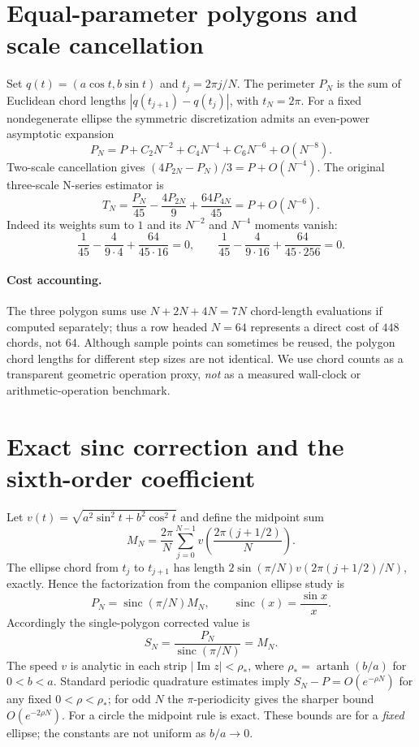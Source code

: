 \documentclass[11pt]{article}
\begin{document}
\section{Equal-parameter polygons and scale cancellation}
Set $q(t)=(a\cos t,b\sin t)$ and $t_j=2\pi j/N$. The perimeter $P_N$ is the sum of Euclidean chord lengths $|q(t_{j+1})-q(t_j)|$, with $t_N=2\pi$. For a fixed nondegenerate ellipse the symmetric discretization admits an even-power asymptotic expansion
\begin{equation}\label{eq:exp}
P_N=P+C_2N^{-2}+C_4N^{-4}+C_6N^{-6}+O(N^{-8}).
\end{equation}
Two-scale cancellation gives $(4P_{2N}-P_N)/3=P+O(N^{-4})$. The original three-scale N-series estimator is
\begin{equation}\label{eq:three}
T_N=\frac{P_N}{45}-\frac{4P_{2N}}9+\frac{64P_{4N}}{45}=P+O(N^{-6}).
\end{equation}
Indeed its weights sum to $1$ and its $N^{-2}$ and $N^{-4}$ moments vanish:
\[
\frac1{45}-\frac{4}{9\cdot 4}+\frac{64}{45\cdot16}=0,\qquad
\frac1{45}-\frac4{9\cdot16}+\frac{64}{45\cdot256}=0.
\]
\paragraph{Cost accounting.} The three polygon sums use $N+2N+4N=7N$ chord-length evaluations if computed separately; thus a row headed $N=64$ represents a direct cost of $448$ chords, not $64$. Although sample points can sometimes be reused, the polygon chord lengths for different step sizes are not identical. We use chord counts as a transparent geometric operation proxy, \emph{not} as a measured wall-clock or arithmetic-operation benchmark.
\section{Exact sinc correction and the sixth-order coefficient}
Let $v(t)=\sqrt{a^2\sin^2t+b^2\cos^2t}$ and define the midpoint sum
\[
M_N=\frac{2\pi}{N}\sum_{j=0}^{N-1}v\left(\frac{2\pi(j+1/2)}N\right).
\]
The ellipse chord from $t_j$ to $t_{j+1}$ has length $2\sin(\pi/N)v(2\pi(j+1/2)/N)$, exactly. Hence the factorization from the companion ellipse study \cite{BakerFactorization} is
\begin{equation}\label{eq:sinc}
P_N=\operatorname{sinc}(\pi/N)M_N,\qquad \operatorname{sinc}(x)=\frac{\sin x}{x}.
\end{equation}
Accordingly the single-polygon corrected value is
\begin{equation}\label{eq:correct}
S_N=\frac{P_N}{\operatorname{sinc}(\pi/N)}=M_N.
\end{equation}
The speed $v$ is analytic in each strip $|\operatorname{Im}z|<\rho_*$, where $\rho_*=\operatorname{artanh}(b/a)$ for $0<b<a$. Standard periodic quadrature estimates imply $S_N-P=O(e^{-\rho N})$ for any fixed $0<\rho<\rho_*$; for odd $N$ the $\pi$-periodicity gives the sharper bound $O(e^{-2\rho N})$. For a circle the midpoint rule is exact. These bounds are for a \emph{fixed} ellipse; the constants are not uniform as $b/a\to0$.
\end{document}
